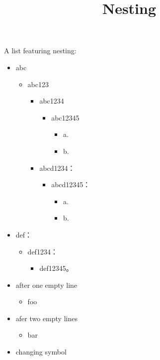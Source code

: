 \documentclass[11pt,a4paper]{article}
\title{Nesting}
\begin{document}
\maketitle

A list featuring nesting:

\begin{itemize}
\item abc
  \begin{itemize}
\item abc123
    \begin{itemize}
\item abc1234
      \begin{itemize}
\item abc12345
        \begin{itemize}
\item a.
\item b.
        \end{itemize}
      \end{itemize}
\item abcd1234：
      \begin{itemize}
\item abcd12345：
        \begin{itemize}
\item a.
\item b.
        \end{itemize}
      \end{itemize}
    \end{itemize}
  \end{itemize}
\item def：
  \begin{itemize}
\item def1234：
    \begin{itemize}
\item def12345。
    \end{itemize}
  \end{itemize}
\item after one empty line
  \begin{itemize}
\item foo
  \end{itemize}
\item afer two empty lines
  \begin{itemize}
\item bar
  \end{itemize}
\end{itemize}

\begin{itemize}
\item changing symbol
\end{itemize}
\end{document}

